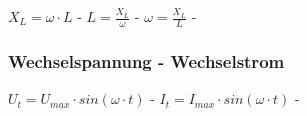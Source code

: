 $ X_{L} =\omega \cdot L $ - $ L = \frac{X_{L} }{\omega } $ - $ \omega =\frac{X_{L} }{L} $ - \\ 
 
\subsubsection{Wechselspannung - Wechselstrom} 
\begin{minipage}{0.45\textwidth} 
\end{minipage} 
\begin{minipage}{0.45\textwidth} 
 
\legende{}\end{minipage} 
 
$ U_{t}  = U_{max} \cdot sin(\omega \cdot t) $ - $ I_{t}  = I_{max} \cdot sin(\omega \cdot t) $ - \\ 
 
